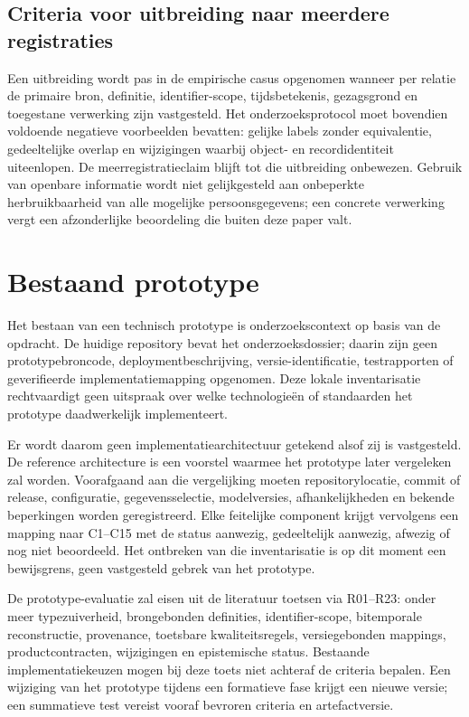 \subsection{Criteria voor uitbreiding naar meerdere registraties}
Een uitbreiding wordt pas in de empirische casus opgenomen wanneer per relatie de primaire bron, definitie, identifier-scope, tijdsbetekenis, gezagsgrond en toegestane verwerking zijn vastgesteld. Het onderzoeksprotocol moet bovendien voldoende negatieve voorbeelden bevatten: gelijke labels zonder equivalentie, gedeeltelijke overlap en wijzigingen waarbij object- en recordidentiteit uiteenlopen. De meerregistratieclaim blijft tot die uitbreiding onbewezen. Gebruik van openbare informatie wordt niet gelijkgesteld aan onbeperkte herbruikbaarheid van alle mogelijke persoonsgegevens; een concrete verwerking vergt een afzonderlijke beoordeling die buiten deze paper valt.

\section{Bestaand prototype}
Het bestaan van een technisch prototype is onderzoekscontext op basis van de opdracht. De huidige repository bevat het onderzoeksdossier; daarin zijn geen prototypebroncode, deploymentbeschrijving, versie-identificatie, testrapporten of geverifieerde implementatiemapping opgenomen. Deze lokale inventarisatie rechtvaardigt geen uitspraak over welke technologieën of standaarden het prototype daadwerkelijk implementeert.

Er wordt daarom geen implementatiearchitectuur getekend alsof zij is vastgesteld. De reference architecture is een voorstel waarmee het prototype later vergeleken zal worden. Voorafgaand aan die vergelijking moeten repositorylocatie, commit of release, configuratie, gegevensselectie, modelversies, afhankelijkheden en bekende beperkingen worden geregistreerd. Elke feitelijke component krijgt vervolgens een mapping naar C1--C15 met de status aanwezig, gedeeltelijk aanwezig, afwezig of nog niet beoordeeld. Het ontbreken van die inventarisatie is op dit moment een bewijsgrens, geen vastgesteld gebrek van het prototype.

De prototype-evaluatie zal eisen uit de literatuur toetsen via R01--R23: onder meer typezuiverheid, brongebonden definities, identifier-scope, bitemporale reconstructie, provenance, toetsbare kwaliteitsregels, versiegebonden mappings, productcontracten, wijzigingen en epistemische status. Bestaande implementatiekeuzen mogen bij deze toets niet achteraf de criteria bepalen. Een wijziging van het prototype tijdens een formatieve fase krijgt een nieuwe versie; een summatieve test vereist vooraf bevroren criteria en artefactversie.

